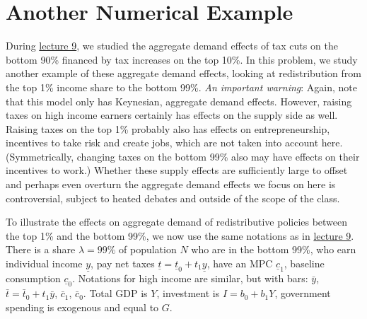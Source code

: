 \documentclass[]{book}
\begin{document}
\section*{Another Numerical Example}\label{another-numerical-example}

During \protect\hyperlink{redistributive}{lecture 9}, we studied the
aggregate demand effects of tax cuts on the bottom 90\% financed by tax
increases on the top 10\%. In this problem, we study another example of
these aggregate demand effects, looking at redistribution from the top
1\% income share to the bottom 99\%. \emph{An important warning}: Again,
note that this model only has Keynesian, aggregate demand effects.
However, raising taxes on high income earners certainly has effects on
the supply side as well. Raising taxes on the top 1\% probably also has
effects on entrepreneurship, incentives to take risk and create jobs,
which are not taken into account here. (Symmetrically, changing taxes on
the bottom 99\% also may have effects on their incentives to work.)
Whether these supply effects are sufficiently large to offset and
perhaps even overturn the aggregate demand effects we focus on here is
controversial, subject to heated debates and outside of the scope of the
class.

To illustrate the effects on aggregate demand of redistributive policies
between the top 1\% and the bottom 99\%, we now use the same notations
as in \protect\hyperlink{redistributive}{lecture 9}. There is a share
\(\lambda = 99\%\) of population \(N\) who are in the bottom 99\%, who
earn individual income \(\underline{y}\), pay net taxes
\(\underline{t}=\underline{t}_0 + t_1 \underline{y}\), have an MPC
\(\underline{c}_1\), baseline consumption \(\underline{c}_0\). Notations
for high income are similar, but with bars: \(\bar{y}\),
\(\bar{t}=\bar{t}_0+t_1 \bar{y}\), \(\bar{c}_1\), \(\bar{c}_0\). Total
GDP is \(Y\), investment is \(I=b_0 +b_1 Y\), government spending is
exogenous and equal to \(G\).
\end{document}
